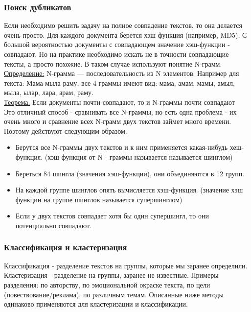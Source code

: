 \subsubsection {Поиск дубликатов}
Если необходимо решить задачу на полное совпадение текстов, то она делается очень просто. Для каждого документа берется хэш-функция (например, MD5). С большой вероятностью документы с совпадающем значение хэш-функции - совпадают. Но на практике необходимо искать не в точности совпадающие тексты, а просто похожие. В таком случае используют понятие N-грамм.  \\
\underline {Определение:} N-грамма — последовательность из N элементов. Например для текста: Мама мыла раму, все 4 граммы имеют вид: мама, амам, мамы, амыл, мыла, ылар, лара, арам, раму.  \\
\underline {Теорема.} Если документы почти совпадают, то и N-граммы почти совпадают\\
Это отличный способ - сравнивать все N-граммы, но есть одна проблема - их очень много и сравнение всех N-грамм двух текстов займет много времени. Поэтому действуют следующим образом.

\begin {itemize}
\item Берутся все N-граммы двух текстов и к ним применяется какая-нибудь хеш-функция. (хэш-функция от N - граммы называется называется шинглом)
\item Береться 84 шингла (значения хэш-функции), они объединяются в 12 групп.
\item На каждой группе шинглов опять вычисляется хэш-функция. (значение хэш функции на группе шинглов называется супершинглом)
\item Если у двух текстов совпадает хотя бы один супершингл,  то они потенциально совпадают.
\end {itemize}

\subsubsection {Классификация и кластеризация}
Классификация - разделение текстов на группы, которые мы заранее определили. Кластеризация - разделение на группы, заранее не известные.
Примеры разделения: по авторству, по эмоциональной окраске текста, по цели (повествование/реклама), по различным темам.
Описанные ниже методы одинаково применяются для кластеризации и классификации.

